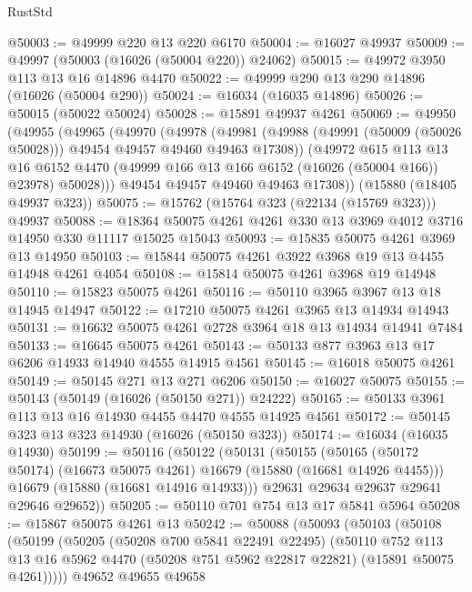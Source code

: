 \begin{lexlean}{RustStd}
\begin{coremodule}
@50003 := @49999 @220 @13 @220 @6170
@50004 := @16027 @49937
@50009 := @49997 (@50003 (@16026 (@50004 @220)) @24062)
@50015 := @49972 @3950 @113 @13 @16 @14896 @4470
@50022 := @49999 @290 @13 @290 @14896 (@16026 (@50004 @290))
@50024 := @16034 (@16035 @14896)
@50026 := @50015 (@50022 @50024)
@50028 := @15891 @49937 @4261
@50069 := @49950
    (@49955
      (@49965
        (@49970
          (@49978
            (@49981 (@49988 (@49991 (@50009 (@50026 @50028))) @49454 @49457 @49460 @49463 @17308))
            (@49972
              @615
              @113
              @13
              @16
              @6152
              @4470
              (@49999 @166 @13 @166 @6152 (@16026 (@50004 @166)) @23978)
              @50028)))
        @49454
        @49457
        @49460
        @49463
        @17308))
    (@15880 (@18405 @49937 @323))
@50075 := @15762 (@15764 @323 (@22134 (@15769 @323))) @49937
@50088 := @18364 @50075 @4261 @4261 @330 @13 @3969 @4012 @3716 @14950 @330 @11117 @15025 @15043
@50093 := @15835 @50075 @4261 @3969 @13 @14950
@50103 := @15844 @50075 @4261 @3922 @3968 @19 @13 @4455 @14948 @4261 @4054
@50108 := @15814 @50075 @4261 @3968 @19 @14948
@50110 := @15823 @50075 @4261
@50116 := @50110 @3965 @3967 @13 @18 @14945 @14947
@50122 := @17210 @50075 @4261 @3965 @13 @14934 @14943
@50131 := @16632 @50075 @4261 @2728 @3964 @18 @13 @14934 @14941 @7484
@50133 := @16645 @50075 @4261
@50143 := @50133 @877 @3963 @13 @17 @6206 @14933 @14940 @4555 @14915 @4561
@50145 := @16018 @50075 @4261
@50149 := @50145 @271 @13 @271 @6206
@50150 := @16027 @50075
@50155 := @50143 (@50149 (@16026 (@50150 @271)) @24222)
@50165 := @50133 @3961 @113 @13 @16 @14930 @4455 @4470 @4555 @14925 @4561
@50172 := @50145 @323 @13 @323 @14930 (@16026 (@50150 @323))
@50174 := @16034 (@16035 @14930)
@50199 := @50116
    (@50122
      (@50131
        (@50155
          (@50165 (@50172 @50174) (@16673 @50075 @4261) @16679 (@15880 (@16681 @14926 @4455)))
          @16679
          (@15880 (@16681 @14916 @14933)))
        @29631
        @29634
        @29637
        @29641
        @29646
        @29652))
@50205 := @50110 @701 @754 @13 @17 @5841 @5964
@50208 := @15867 @50075 @4261 @13
@50242 := @50088
    (@50093
      (@50103
        (@50108
          (@50199
            (@50205
              (@50208 @700 @5841 @22491 @22495)
              (@50110
                @752
                @113
                @13
                @16
                @5962
                @4470
                (@50208 @751 @5962 @22817 @22821)
                (@15891 @50075 @4261)))))
        @49652
        @49655
        @49658

\end{coremodule}
\end{lexlean}
